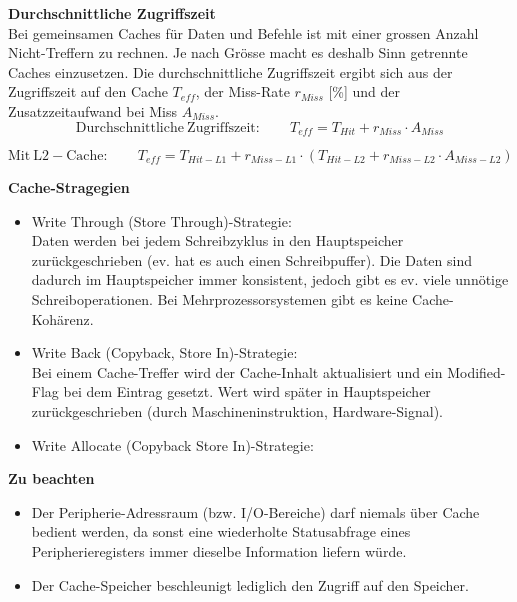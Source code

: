 \textbf{Durchschnittliche Zugriffszeit}\\
Bei gemeinsamen Caches für Daten und Befehle ist mit einer grossen Anzahl Nicht-Treffern zu rechnen.
Je nach Grösse macht es deshalb Sinn getrennte Caches einzusetzen. Die durchschnittliche Zugriffszeit ergibt sich aus der Zugriffszeit auf den Cache $T_{eff}$, der Miss-Rate $r_{Miss}$ [\%] und der Zusatzzeitaufwand bei Miss $A_{Miss}$.
\begin{equation*}
	\mathrm{Durchschnittliche \ Zugriffszeit:} \qquad T_{eff} = T_{Hit} + r_{Miss} \cdot A_{Miss}
\end{equation*}

\begin{equation*}
\mathrm{Mit \ L2-Cache:} \qquad T_{eff} = T_{Hit-L1} + r_{Miss-L1} \cdot \left( T_{Hit-L2} + r_{Miss-L2} \cdot A_{Miss-L2} \right)
\end{equation*}

\textbf{Cache-Stragegien}
\begin{itemize}[noitemsep,topsep=0pt]
	\item Write Through (Store Through)-Strategie:\\
	Daten werden bei jedem Schreibzyklus in den Hauptspeicher zurückgeschrieben (ev. hat es auch einen Schreibpuffer).
	Die Daten sind dadurch im Hauptspeicher immer konsistent, jedoch gibt es ev. viele unnötige Schreiboperationen.
	Bei Mehrprozessorsystemen gibt es keine Cache-Kohärenz.
	
	\item Write Back (Copyback, Store In)-Strategie:\\
	Bei einem Cache-Treffer wird der Cache-Inhalt aktualisiert und ein Modified-Flag bei dem Eintrag gesetzt.
	Wert wird später in Hauptspeicher zurückgeschrieben (durch Maschineninstruktion, Hardware-Signal).
	
	\item Write Allocate (Copyback Store In)-Strategie:
\end{itemize}

\textbf{Zu beachten}
\begin{itemize}[noitemsep,topsep=0pt]
	\item Der Peripherie-Adressraum (bzw. I/O-Bereiche) darf niemals über Cache bedient werden, da sonst eine wiederholte Statusabfrage eines Peripherieregisters immer dieselbe Information liefern würde.
	
	\item Der Cache-Speicher beschleunigt lediglich den Zugriff auf den Speicher.
	
\end{itemize}

